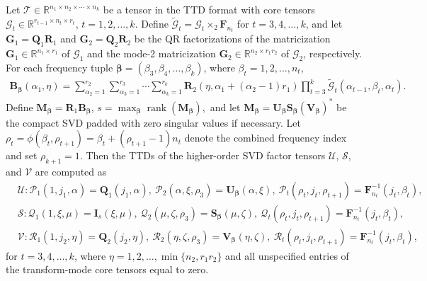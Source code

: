 \documentclass[onefignum,onetabnum]{siamart250211}
\begin{document}
\begin{proposition}
\label{thm:ttd_kth_tsvd_core}
Let $\mathscr{T}\in\mathbb{R}^{n_1\times n_2\times\cdots\times n_k}$ be a tensor in the TTD format with core tensors $\mathscr{G}_t\in\mathbb{R}^{r_{t-1}\times n_t\times r_t}$, $t=1,2, \dots,k$. Define $\widetilde{\mathscr{G}}_t=\mathscr{G}_t\times_2\textbf{F}_{n_t}$ for $t=3,4,\dots,k$, and let $\textbf{G}_1=\textbf{Q}_1\textbf{R}_1$ and $\textbf{G}_2=\textbf{Q}_2\textbf{R}_2$ be the QR factorizations of the matricization $\textbf{G}_1\in\mathbb{R}^{n_1\times r_1}$ of $\mathscr{G}_1$ and the mode-2 matricization $\textbf{G}_2\in\mathbb{R}^{n_2\times r_1r_2}$ of $\mathscr{G}_2$, respectively. For each frequency tuple $\boldsymbol{\beta}=(\beta_3,\beta_4,\dots,\beta_k)$, where $\beta_t=1,2,\dots,n_t$,
\begin{align*}
\textbf{B}_{\boldsymbol{\beta}}(\alpha_1,\eta)
= \sum_{\alpha_2=1}^{r_2}\sum_{\alpha_3 = 1}^{r_3}
\cdots
\sum_{\alpha_k=1}^{r_k}
\textbf{R}_2(\eta,\alpha_1+(\alpha_2-1)r_1)
\prod_{t=3}^{k}
\widetilde{\mathscr{G}}_t(\alpha_{t-1},\beta_t,\alpha_t).
\end{align*}
Define $\textbf{M}_{\boldsymbol{\beta}}
= \textbf{R}_1\textbf{B}_{\boldsymbol{\beta}}$, $s=\max_{\boldsymbol{\beta}}\operatorname{rank}
(\textbf{M}_{\boldsymbol{\beta}}),$ and
let $\textbf{M}_{\boldsymbol{\beta}}
=
\textbf{U}_{\boldsymbol{\beta}}
\boldsymbol{S}_{\boldsymbol{\beta}}
(\textbf{V}_{\boldsymbol{\beta}})^*$
be the compact SVD padded with zero singular values if necessary. Let $\rho_t= \phi(\beta_t, \rho_{t+1}) = \beta_t+(\rho_{t+1}-1)n_t$ denote the combined frequency index and set $\rho_{k+1}=1$.
Then the TTDs of the higher-order SVD factor tensors
$\mathscr{U}$, $\mathscr{S}$, and $\mathscr{V}$ are computed as
\begin{align*}
&\mathscr{U}:\mathscr{P}_1(1,j_1,\alpha)
=
\textbf{Q}_1(j_1,\alpha),
\
\mathscr{P}_2(\alpha,\xi,\rho_3)
=
\textbf{U}_{\boldsymbol{\beta}}(\alpha,\xi),
\
\mathscr{P}_t(\rho_t, j_t, \rho_{t+1})=\textbf{F}_{n_t}^{-1}(j_t, \beta_t),\\
&\mathscr{S}: \mathscr{Q}_1(1,\xi,\mu)=\textbf{I}_s(\xi,\mu),
\
\mathscr{Q}_2(\mu,\zeta,\rho_3)
=
\boldsymbol{S}_{\boldsymbol{\beta}}(\mu,\zeta),
\
\mathscr{Q}_t(\rho_t, j_t, \rho_{t+1}) =\textbf{F}_{n_t}^{-1}(j_t, \beta_t), \\
&\mathscr{V}: \mathscr{R}_1(1,j_2,\eta)=\textbf{Q}_2(j_2,\eta),
\
\mathscr{R}_2(\eta,\zeta,\rho_3)
=
\textbf{V}_{\boldsymbol{\beta}}(\eta,\zeta),
\
\mathscr{R}_t(\rho_t, j_t, \rho_{t+1}) =\textbf{F}_{n_t}^{-1}(j_t, \beta_t),
\end{align*}
for $t = 3, 4, \dots, k$, where $\eta=1,2,\dots,\min\{n_2,r_1r_2\}$ and all unspecified entries of the transform-mode core tensors equal to zero.
\end{proposition}
\end{document}
